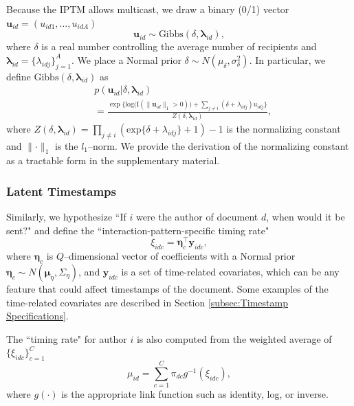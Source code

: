 \documentclass{article}
\begin{document}
Because the IPTM allows multicast, we draw a binary (0/1) vector $\boldsymbol{u}_{id}= (u_{id1},
	\ldots, u_{idA})$
	\begin{equation} \boldsymbol{u}_{id}  \sim
	\mbox{Gibbs}(\delta, \boldsymbol{\lambda}_{id}),
	\end{equation}
where $\delta$ is a real number controlling the average number of recipients and $\boldsymbol{\lambda}_{id}= \{\lambda_{idj}\}_{j=1}^A$. We place a Normal prior $\delta \sim N(\mu_\delta,\sigma^2_\delta)$. In particular, we define $\mbox{Gibbs}(\delta, \boldsymbol{\lambda}_{id})$ as
\begin{equation}
\begin{aligned}
&p(\boldsymbol{u}_{id}|\delta, \boldsymbol{\lambda}_{id}) \\&= \frac{\exp\Big\{\mbox{log}\big(\text{I}( \lVert \boldsymbol{u}_{id}\rVert_1 > 0 )\big) + \sum_{j \neq i} (\delta+\lambda_{idj})u_{idj}\Big\}}{Z(\delta,\boldsymbol{\lambda}_{id})} ,
\end{aligned}
\label{eqn:Gibbs}
\end{equation}
where $Z(\delta,\boldsymbol{\lambda}_{id})= \prod_{j \neq i } (\mbox{exp}\{\delta+\lambda_{idj}\} + 1)-1$ is the normalizing constant and $\lVert \cdot \rVert_1$ is the $l_1$--norm. We provide the derivation of the normalizing constant as a tractable form in the supplementary material. 

\subsubsection{Latent Timestamps}\label{subsubsec:Hypothetical Timestamps}
Similarly, we hypothesize ``If $i$ were the author of document $d$, when would it be sent?" and define the ``interaction-pattern-specific timing rate"
\begin{equation}
\xi_{idc} = \boldsymbol{\eta}_c^\top \boldsymbol{y}_{idc},
\end{equation}
where $\boldsymbol{\eta}_c$ is $Q$--dimensional vector of coefficients with a Normal prior $\boldsymbol{\eta}_c \sim N(\boldsymbol{\mu}_\eta,\Sigma_\eta)$, and $\boldsymbol{y}_{idc}$ is a set of time-related covariates, which can be any feature that could affect timestamps of the document. Some examples of the time-related covariates are described in Section \ref{subsec:Timestamp Specifications}.

The ``timing rate" for author $i$ is also computed from the weighted average of $\{\xi_{idc}\}_{c=1}^C$ 
\begin{equation}
\mu_{id} = \sum_{c=1}^C \pi_{dc} g^{-1}(\xi_{idc}),
\end{equation}
where $g(\cdot)$ is the appropriate link function such as identity, log, or inverse. 
\end{document}
